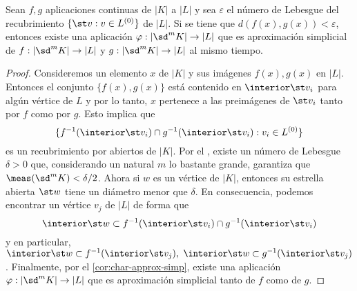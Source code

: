 \begin{lema}
	\label{lem:aprox-simpl-f-cont}
	Sean $f,g$ aplicaciones continuas de $|K|$ a $|L|$ y sea $\varepsilon$ el número de Lebesgue del recubrimiento $\{ \st v : v \in L^{(0)} \}$ de $|L|$. Si se tiene que $d(f(x), g(x)) < \varepsilon$, entonces existe una aplicación $\varphi : |\sd^m K| \to |L|$ que es aproximación simplicial de $f: |\sd^m K| \to |L|$ y $g: |\sd^m K| \to |L|$ al mismo tiempo.
\end{lema}
\begin{proof}
	Consideremos un elemento $x$ de $|K|$ y sus imágenes $f(x), g(x)$ en $|L|$. Entonces el conjunto $\{f(x),g(x)\}$ está contenido en $\interior \st v_i$ para algún vértice de $L$ y por lo tanto, $x$ pertenece a las preimágenes de $\st v_i$ tanto por $f$ como por $g$. Esto implica que
	\[
		\{ f^{-1}(\interior \st v_i) \cap g^{-1}(\interior \st v_i) : v_i \in L^{(0)} \}
	\]
	es un recubrimiento por abiertos de $|K|$. Por el , existe un número de Lebesgue $\delta > 0$ que, considerando un natural $m$ lo bastante grande, garantiza que $\meas(\sd^m K) < \delta/2$. Ahora si $w$ es un vértice de $|K|$, entonces su estrella abierta $\st w$ tiene un diámetro menor que $\delta$. En consecuencia, podemos encontrar un vértice $v_j$ de $|L|$ de forma que
	\[
		\interior \st w \subset f^{-1}(\interior \st v_i) \cap g^{-1}(\interior \st v_i)
	\]
	y en particular,
	$\interior \st w \subset f^{-1}(\interior \st v_j),\ \interior \st w \subset g^{-1}(\interior \st v_j)$. Finalmente, por el \autoref{cor:char-approx-simp}, existe una aplicación $\varphi : |\sd^m K| \to |L|$ que es aproximación simplicial tanto de $f$ como de $g$.
\end{proof}

